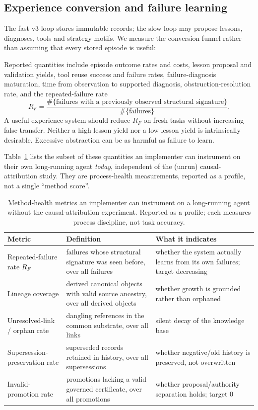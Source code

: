 \subsection{Experience conversion and failure learning}

The fast v3 loop stores immutable \TaskEpisode{} records; the slow loop may propose lessons, diagnoses, tools and strategy motifs. We measure the conversion funnel rather than assuming that every stored episode is useful:

Reported quantities include episode outcome rates and costs, lesson proposal and validation yields, tool reuse success and failure rates, failure-diagnosis maturation, time from observation to supported diagnosis, obstruction-resolution rate, and the repeated-failure rate
\[
R_F=
\frac{\#\{\text{failures with a previously observed structural signature}\}}
     {\#\{\text{failures}\}}.
\]
A useful experience system should reduce $R_F$ on fresh tasks without increasing false transfer. Neither a high lesson yield nor a low lesson yield is intrinsically desirable. Excessive abstraction can be as harmful as failure to learn.

Table~\ref{tab:method-metrics} lists the subset of these quantities an implementer can instrument on their own long-running agent \emph{today}, independent of the (unrun) causal-attribution study. They are process-health measurements, reported as a profile, not a single ``method score''.

\begin{table}[t]
\footnotesize
\begin{tabular}{@{}p{} p{} p{}@{}}
\hline
\textbf{Metric} & \textbf{Definition} & \textbf{What it indicates} \\
\hline
Repeated-failure rate $R_F$ & failures whose structural signature was seen before, over all failures & whether the system actually learns from its own failures; target decreasing \\
Lineage coverage & derived canonical objects with valid source ancestry, over all derived objects & whether growth is grounded rather than orphaned \\
Unresolved-link / orphan rate & dangling references in the common substrate, over all links & silent decay of the knowledge base \\
Supersession-preservation rate & superseded records retained in history, over all supersessions & whether negative/old history is preserved, not overwritten \\
Invalid-promotion rate & promotions lacking a valid governed certificate, over all promotions & whether proposal/authority separation holds; target $0$ \\
\hline
\end{tabular}
\caption{Method-health metrics an implementer can instrument on a long-running agent without the causal-attribution experiment. Reported as a profile; each measures process discipline, not task accuracy.}
\label{tab:method-metrics}
\end{table}

